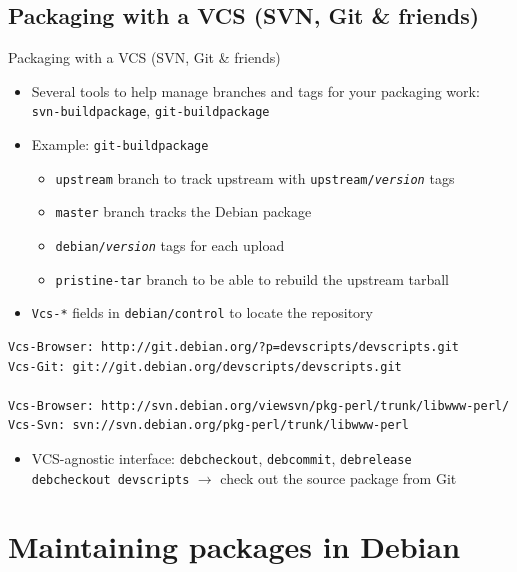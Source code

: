 \documentclass[10pt,final]{beamer}
\begin{document}
\subsection{Packaging with a VCS (SVN, Git \& friends)}
\begin{frame}[fragile]{Packaging with a VCS (SVN, Git \& friends)}
\begin{itemize}
\item Several tools to help manage branches and tags for your packaging work:\\
\texttt{svn-buildpackage}, \texttt{git-buildpackage}
\hbr
\item Example: \texttt{git-buildpackage}
	\begin{itemize}
		\item \texttt{upstream} branch to track upstream with \texttt{upstream/\textsl{version}} tags
		\item \texttt{master} branch tracks the Debian package
		\item \texttt{debian/\textsl{version}} tags for each upload
		\item \texttt{pristine-tar} branch to be able to rebuild the upstream tarball
	\end{itemize}
\hbr
\item \texttt{Vcs-*} fields in \texttt{debian/control} to locate the repository
\end{itemize}
\begin{lstlisting}[basicstyle=\ttfamily\footnotesize]
Vcs-Browser: http://git.debian.org/?p=devscripts/devscripts.git
Vcs-Git: git://git.debian.org/devscripts/devscripts.git

Vcs-Browser: http://svn.debian.org/viewsvn/pkg-perl/trunk/libwww-perl/
Vcs-Svn: svn://svn.debian.org/pkg-perl/trunk/libwww-perl
\end{lstlisting}
\begin{itemize}
	\item VCS-agnostic interface: \texttt{debcheckout}, \texttt{debcommit}, \texttt{debrelease}\\
		\texttt{debcheckout devscripts} $\rightarrow$ check out the source package from Git
\end{itemize}
\end{frame}

\section{Maintaining packages in Debian}
\end{document}

